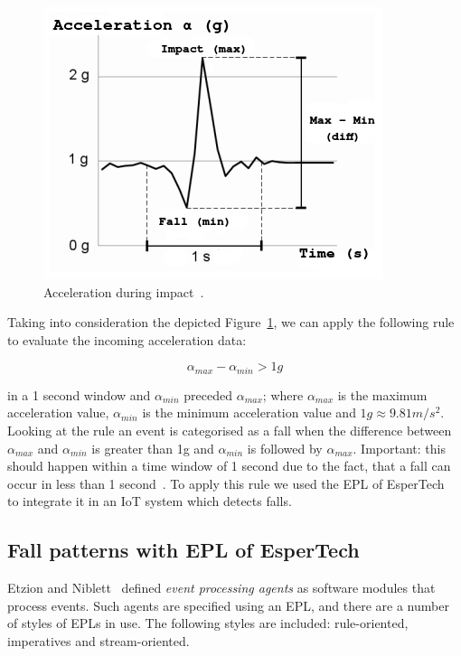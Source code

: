 \documentclass[journal]{IEEEtran}
\begin{document}
\begin{figure}[!ht]
  \centering
  \includegraphics[scale=0.6]{img/FallGraph}
  \caption[Acceleration during impact]{Acceleration during impact~\cite{Kozina}.}
  \label{fig:grafica}
\end{figure}

Taking into consideration the depicted Figure~\ref{fig:grafica}, we can apply the following rule to evaluate the incoming acceleration data:

\begin{equation}\label{eq:caida}
 \alpha_{max} - \alpha_{min} > 1g
\end{equation}

in a 1 second window and $\alpha_{min}$ preceded $\alpha_{max}$; where $\alpha_{max}$ is the maximum acceleration value, 
$\alpha_{min}$ is the minimum acceleration value and $1g\approx9.81m/s^{2}$. Looking at the rule an event is categorised as a fall when the 
difference between $\alpha_{max}$ and $\alpha_{min}$ is greater than 1g and $\alpha_{min}$ is followed by $\alpha_{max}$. 
Important: this should happen within a time window of 1 second due to the fact, that a fall can occur in less than 1 second~\cite{Luder2009}.
To apply this rule we used the EPL of EsperTech~\cite{Esper:2016} to integrate it in an IoT system which detects falls.

\subsection{Fall patterns with EPL of EsperTech}

Etzion and Niblett~\cite{Etz10} defined \textit{event processing agents} as software modules that process events. Such agents are specified using an 
EPL, and there are a number of styles of EPLs in use. The following styles are included: rule-oriented, imperatives and stream-oriented.
\end{document}

